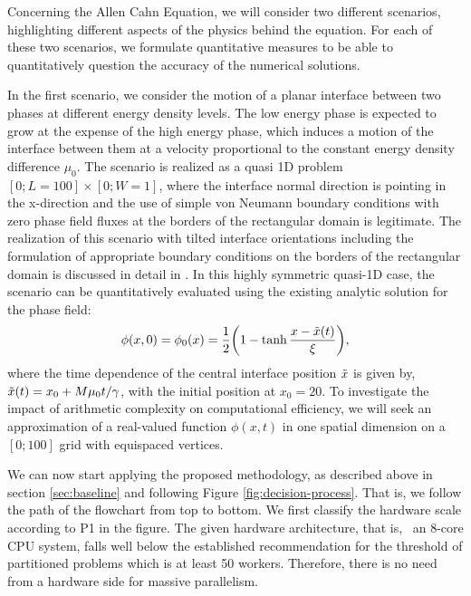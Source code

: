 \documentclass[asi,article,submit,moreauthors]{Definitions/mdpi}
\begin{document}
Concerning the Allen Cahn Equation, we will consider two different scenarios, highlighting different aspects of the physics behind the equation. 
For each of these two scenarios, we formulate quantitative measures to be able to quantitatively question the accuracy of the numerical solutions.

In the first scenario, we consider the motion of a planar interface between two phases at different energy density levels. 
The low energy phase is expected to grow at the expense of the high energy phase, which induces a motion of the interface between them at a velocity proportional to the constant energy density difference $\mu_0$.
The scenario is realized as a quasi 1D problem $[0;L=100]\times[0;W=1]$, where the interface normal direction is pointing in the x-direction and the use of simple von Neumann boundary conditions with zero phase field fluxes at the borders of the rectangular domain is legitimate. 
The realization of this scenario with tilted interface orientations including the formulation of appropriate boundary conditions on the borders of the rectangular domain is discussed in detail in \cite{fleckFrictionlessMotionDiffuse2022}.
In this highly symmetric quasi-1D case, the scenario can be quantitatively evaluated using the existing analytic solution for the phase field:
\begin{align}
    \phi(x,0) = \phi_0(x) = \frac{1}{2} \left(1 - \tanh{\frac{x - \Tilde{x}(t)}{\xi}}\right) , \label{eq:ac-analytical}
\end{align}
where the time dependence of the central interface position $\Tilde{x}$ is given by, $\Tilde{x}(t) = x_0 + {M \mu_0 t}  /{\gamma}$, with the initial position at $x_0 = 20$.
To investigate the impact of arithmetic complexity on computational efficiency, we will seek an approximation of a real-valued function $\phi (x,t)$ in one spatial dimension on a $[0;100]$ grid with equispaced vertices. 


We can now start applying the proposed methodology, as described above in section \ref{sec:baseline} and following Figure \ref{fig:decision-process}.
That is, we follow the path of the flowchart from top to bottom.
We first classify the hardware scale according to P1 in the figure.
The given hardware architecture, that is, ~an 8-core CPU system, falls well below the established recommendation for the threshold of partitioned problems which is at least 50 workers.
Therefore, there is no need from a hardware side for massive parallelism.
\end{document}
